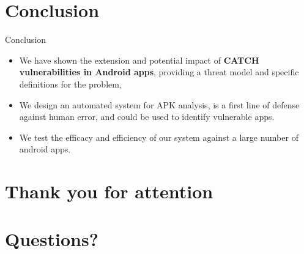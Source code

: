 \documentclass[10pt]{beamer}
\begin{document}
\section{Conclusion}
\begin{frame}[fragile]{Conclusion}
  
  \begin{itemize}
    
  \item We have shown the extension and potential impact of {\bf CATCH
      vulnerabilities in Android apps}, providing a threat model and
    specific definitions for the problem,

  \item We design an automated system for APK analysis, is a first
    line of defense against human error, and could be used to identify
    vulnerable apps.

  \item We test the efficacy and efficiency of our system against a
    large number of android apps.
  
\end{itemize}
\end{frame}

\section*{Thank you for attention}

\section*{Questions?}
\end{document}
